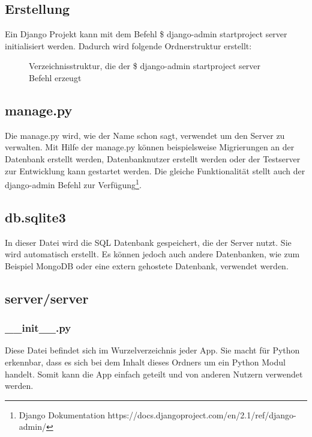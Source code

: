 \documentclass{article}
\begin{document}
\subsection{Erstellung}
Ein Django Projekt kann mit dem Befehl \$ django-admin startproject server initialisiert werden. Dadurch wird folgende Ordnerstruktur erstellt:
\begin{figure}[H]
\caption{Verzeichnisstruktur, die der \$ django-admin startproject server Befehl erzeugt}
\end{figure}
\subsection{manage.py}
Die manage.py wird, wie der Name schon sagt, verwendet um den Server zu verwalten. Mit Hilfe der manage.py können beispielsweise Migrierungen an der Datenbank erstellt werden, Datenbanknutzer erstellt werden oder der Testserver zur Entwicklung kann gestartet werden. Die gleiche Funktionalität stellt auch der django-admin Befehl zur Verfügung\footnote{Django Dokumentation https://docs.djangoproject.com/en/2.1/ref/django-admin/}.

\subsection{db.sqlite3}
In dieser Datei wird die SQL Datenbank gespeichert, die der Server nutzt. Sie wird automatisch erstellt. Es können jedoch auch andere Datenbanken, wie zum Beispiel MongoDB oder eine extern gehostete Datenbank, verwendet werden.

\subsection{server/server} 
\subsubsection{\_\_init\_\_.py}
Diese Datei befindet sich im Wurzelverzeichnis jeder App. Sie macht für Python erkennbar, dass es sich bei dem Inhalt dieses Ordners um ein Python Modul handelt. Somit kann die App einfach geteilt und von anderen Nutzern verwendet werden.
\end{document}
